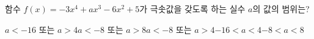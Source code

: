 함수 $f(x)=-3x^4+ax^3-6x^2+5$가 극솟값을 갖도록 하는 실수 $a$의 값의 범위는?
\begin{choicesii}{$a<-16$ 또는 $a>4$}{$a<-8$ 또는 $a>8$}{$a<-8$ 또는 $a>4$}{$-16<a<4$}{$-8<a<8$}\end{choicesii}

